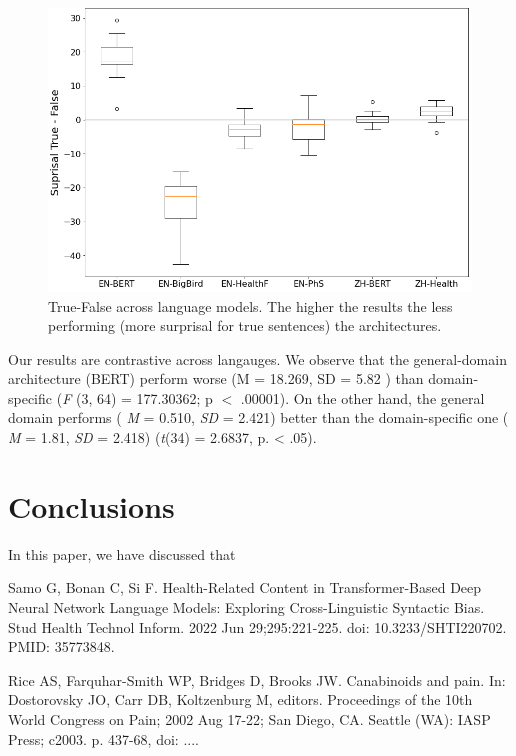 \documentclass{IOS-Book-Article}
\begin{document}
\begin{figure}[H]
    \centering
    \includegraphics[scale=0.35]{graphmatplot}
    \caption{True-False across language models. The higher the results the less performing (more surprisal for true sentences) the architectures.}
    \label{fig:my_label}
\end{figure}

Our results are contrastive across langauges. We observe that the general-domain architecture (BERT) perform worse (M = 18.269, SD = 5.82 ) than domain-specific (\textit{F} (3, 64) = 177.30362; p $<$ .00001). On the other hand, the general domain performs ( \textit{M} = 0.510, \textit{SD} = 2.421) better than the domain-specific one ( \textit{M} = 1.81, \textit{SD} = 2.418) (\textit{t}(34) = 2.6837, p. < .05).

\section{Conclusions}
In this paper, we have discussed that 

\begin{thebibliography}{99}


Samo G, Bonan C, Si F. Health-Related Content in Transformer-Based Deep Neural Network Language Models: Exploring Cross-Linguistic Syntactic Bias. Stud Health Technol Inform. 2022 Jun 29;295:221-225. doi: 10.3233/SHTI220702. PMID: 35773848.

Rice AS, Farquhar-Smith WP, Bridges D, Brooks JW. Canabinoids and pain. In: Dostorovsky JO,
Carr DB, Koltzenburg M, editors. Proceedings of the 10th World Congress on Pain;  2002 Aug
17-22; San Diego, CA. Seattle (WA): IASP Press; c2003. p. 437-68, doi: ....

\end{thebibliography}
\end{document}
